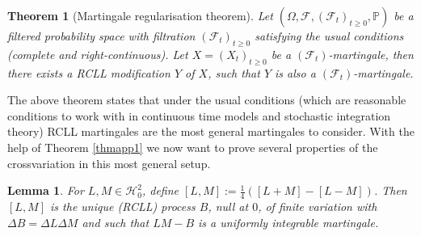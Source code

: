 \documentclass[12pt,a4paper, twoside]{article}
\newtheorem{lem}{Lemma}[section]
\newtheorem{thm}{Theorem}[section]
\theoremstyle{definition}
\newcommand{\PP}{\mathbb{P}} %
\begin{document}
\begin{thm}[Martingale regularisation theorem] Let $( \Omega, \mathcal{F}, (\mathcal{F}_t)_{t \geq 0},  \PP)$ be a filtered probability space with filtration $(\mathcal{F}_t)_{t \geq 0}$ satisfying the usual conditions (complete and right-continuous). Let $X=(X_t)_{t \geq 0}$ be a $( \mathcal{F}_t)$-martingale, then there exists a RCLL modification $Y$ of $X$,  such that $Y$ is also a $(\mathcal{F}_t)$-martingale. 
\end{thm}
The above theorem states that under the usual conditions (which are reasonable conditions to work with in continuous time models and stochastic integration theory) RCLL martingales are the most general martingales to consider. 
\newpage
With the help of Theorem \ref{thmapp1} we now want to prove several properties of the crossvariation in this most general setup. 
\begin{lem} \label{applem1} For $L,M \in \mathcal{H}_0^2$, define $[L,M]:= \frac{1}{4}([L+M]-[L-M])$. Then $[L,M]$ is the unique (RCLL) process $B$, null at $0$, of finite variation with $\Delta B = \Delta L \Delta M$ and such that $LM-B$ is a uniformly integrable martingale.
\end{lem}
\end{document}
